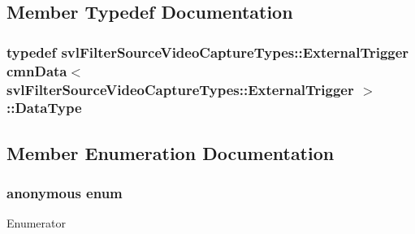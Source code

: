 \subsection{Member Typedef Documentation}
\hypertarget{classcmn_data_3_01svl_filter_source_video_capture_types_1_1_external_trigger_01_4_a40012c3eec7676d2b0252443ae621472}{}
\subsubsection[{Data\+Type}]{\setlength{\rightskip}{0pt plus 5cm}typedef {\bf svl\+Filter\+Source\+Video\+Capture\+Types\+::\+External\+Trigger} {\bf cmn\+Data}$<$ {\bf svl\+Filter\+Source\+Video\+Capture\+Types\+::\+External\+Trigger} $>$\+::{\bf Data\+Type}}\label{classcmn_data_3_01svl_filter_source_video_capture_types_1_1_external_trigger_01_4_a40012c3eec7676d2b0252443ae621472}


\subsection{Member Enumeration Documentation}
\hypertarget{classcmn_data_3_01svl_filter_source_video_capture_types_1_1_external_trigger_01_4_a0e9d4919cc13d1fe880ab5f1aa0b385b}{}\subsubsection[{anonymous enum}]{\setlength{\rightskip}{0pt plus 5cm}anonymous enum}\label{classcmn_data_3_01svl_filter_source_video_capture_types_1_1_external_trigger_01_4_a0e9d4919cc13d1fe880ab5f1aa0b385b}
\begin{Desc}
\item[Enumerator]\par
\begin{description}
\item[{\em 
\hypertarget{classcmn_data_3_01svl_filter_source_video_capture_types_1_1_external_trigger_01_4_a0e9d4919cc13d1fe880ab5f1aa0b385badc3c140213120ad9726d550daf5993a7}{}I\+S\+\_\+\+S\+P\+E\+C\+I\+A\+L\+I\+Z\+E\+D\label{classcmn_data_3_01svl_filter_source_video_capture_types_1_1_external_trigger_01_4_a0e9d4919cc13d1fe880ab5f1aa0b385badc3c140213120ad9726d550daf5993a7}
}]\end{description}
\end{Desc}


